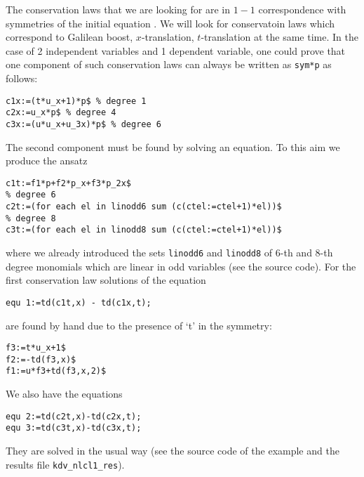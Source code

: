 The conservation laws that we are looking for are in $1-1$ correspondence with
symmetries of the initial equation \cite{KerstenKrasilshchikVerboretsky:2004}. We will look for conservatoin
laws which correspond to Galilean boost, $x$-translation, $t$-translation at
the same time.  In the case of 2 independent variables and 1 dependent
variable, one could prove that one component of such conservation laws can
always be written as \texttt{sym*p} as follows:
\begin{verbatim}
c1x:=(t*u_x+1)*p$ % degree 1
c2x:=u_x*p$ % degree 4
c3x:=(u*u_x+u_3x)*p$ % degree 6
\end{verbatim}
The second component must be found by solving an equation. To this aim we
produce the ansatz
\begin{verbatim}
c1t:=f1*p+f2*p_x+f3*p_2x$
% degree 6
c2t:=(for each el in linodd6 sum (c(ctel:=ctel+1)*el))$
% degree 8
c3t:=(for each el in linodd8 sum (c(ctel:=ctel+1)*el))$
\end{verbatim}
where we already introduced the sets \texttt{linodd6} and \texttt{linodd8} of
$6$-th and $8$-th degree monomials which are linear in odd variables (see the
source code). For the first conservation law solutions of the equation
\begin{verbatim}
equ 1:=td(c1t,x) - td(c1x,t);
\end{verbatim}
are found by hand due to the presence of `t' in the symmetry:
\begin{verbatim}
f3:=t*u_x+1$
f2:=-td(f3,x)$
f1:=u*f3+td(f3,x,2)$
\end{verbatim}
We also have the equations
\begin{verbatim}
equ 2:=td(c2t,x)-td(c2x,t);
equ 3:=td(c3t,x)-td(c3x,t);
\end{verbatim}
They are solved in the usual way (see the source code of the example and the
results file \texttt{kdv\_nlcl1\_res}).

